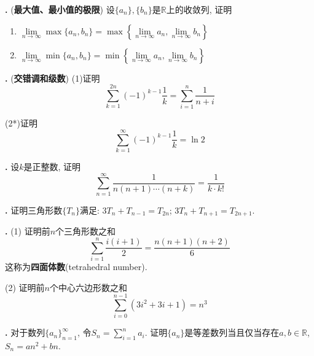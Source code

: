 \par \textbf{\theprobseq .} (\textbf{最大值、最小值的极限}) 设$\{a_n\},\{b_n\}$是$\mathbb{R}$上的收敛列, 证明
\begin{enumerate}
\item $\lim\limits_{n\to \infty} \max \{a_n, b_n\} = \max \left\{\lim\limits_{n\to \infty} a_n, \lim\limits_{n\to \infty} b_n\right\}$
\item $\lim\limits_{n\to \infty} \min \{a_n, b_n\} = \min \left\{\lim\limits_{n\to \infty} a_n, \lim\limits_{n\to \infty} b_n\right\}$
\end{enumerate}

\par \textbf{\theprobseq .} (\textbf{交错调和级数}) (1)证明
\begin{equation}
    \sum_{k=1}^{2n} (-1)^{k-1} \frac{1}{k}=\sum_{i=1}^{n} \frac{1}{n+i}
\end{equation}
\par (2*)证明
\begin{equation}
    \sum_{k=1}^{\infty} (-1)^{k-1} \frac{1}{k}=\ln 2
\end{equation}

\par \textbf{\theprobseq .} 设$k$是正整数, 证明
\begin{equation}
    \sum_{n=1}^{\infty} \frac{1}{n(n+1)\cdots(n+k)} = \frac{1}{k\cdot k!}
\end{equation}

\par \textbf{\theprobseq .} \cite{BN} 证明三角形数$\{T_n\}$满足: $3T_n+T_{n-1}=T_{2n}$; $3T_n+T_{n+1}=T_{2n+1}$.

\par \textbf{\theprobseq .} \cite{BN} 
(1) 证明前$n$个三角形数之和
\begin{equation}
    \sum_{i=1}^{n}\frac{i(i+1)}{2}= \frac{n(n+1)(n+2)}{6}
\end{equation}
这称为\textbf{四面体数}(tetrahedral number).
\par (2) 证明前$n$个中心六边形数之和
\begin{equation}
\sum_{i=0}^{n-1} (3i^2+3i+1)= n^3
\end{equation}


\par \textbf{\theprobseq .} \cite{SMI} 对于数列$\{a_n\}_{n=1}^\infty$, 令$S_n=\sum_{i=1}^n a_i$. 证明$\{a_n\}$是等差数列当且仅当存在$a,b\in \mathbb{R}$, $S_n=an^2+bn$. 

